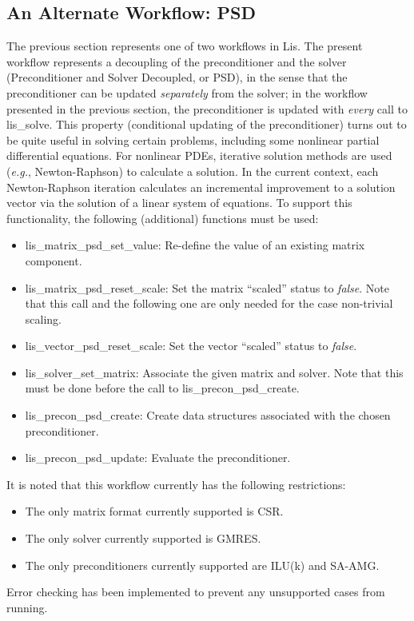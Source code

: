 \documentclass[a4paper]{article}
\begin{document}
\subsection{An Alternate Workflow: PSD}
The previous section represents one of two workflows in Lis.  The present
workflow represents a decoupling of the preconditioner and the solver
(Preconditioner and Solver Decoupled, or PSD), in the sense that the
preconditioner can be updated \textit{separately} from the solver; in the
workflow presented in the previous section, the preconditioner is updated with
\textit{every} call to lis\_solve.  This property (conditional updating of the
preconditioner) turns out to be quite useful in solving certain problems,
including some nonlinear partial differential equations.  For nonlinear PDEs,
iterative solution methods are used (\textit{e.g.}, Newton-Raphson) to
calculate a solution.  In the current context, each Newton-Raphson iteration
calculates an incremental improvement to a solution vector via the solution of
a linear system of equations.  To support this functionality, the following
(additional) functions must be used:
%
\begin{itemize}
\item lis\_matrix\_psd\_set\_value: Re-define the value of an existing matrix component.
\item lis\_matrix\_psd\_reset\_scale: Set the matrix ``scaled'' status to
\textit{false}.  Note that this call and the following one are only needed for
the case non-trivial scaling.
\item lis\_vector\_psd\_reset\_scale: Set the vector ``scaled'' status to \textit{false}.
\item lis\_solver\_set\_matrix: Associate the given matrix and solver.  Note that this must be done
before the call to lis\_precon\_psd\_create.
\item lis\_precon\_psd\_create: Create data structures associated with the chosen preconditioner.
\item lis\_precon\_psd\_update: Evaluate the preconditioner.
\end{itemize}
%
It is noted that this workflow currently has the following restrictions:
%
\begin{itemize}
\item The only matrix format currently supported is CSR.
\item The only solver currently supported is GMRES.
\item The only preconditioners currently supported are ILU(k) and SA-AMG.
\end{itemize}
%
Error checking has been implemented to prevent any unsupported cases from
running.
\end{document}
